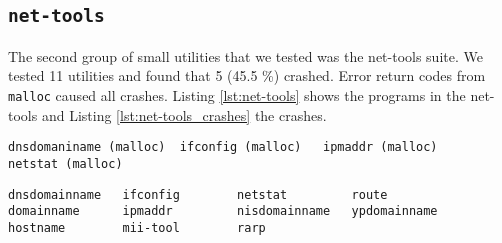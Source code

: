 \subsection{\texttt{net-tools}}
The second group of small utilities that we tested was the net-tools suite. We tested 11 utilities and found that 5 (45.5 \%) crashed. Error return codes from \texttt{malloc} caused all crashes. Listing \ref{lst:net-tools} shows the programs in the net-tools and Listing \ref{lst:net-tools_crashes} the crashes.

\begin{lstlisting}[label={lst:net-tools_crashes},caption={Crashes in net-tools}]
dnsdomaniname (malloc)	ifconfig (malloc)	ipmaddr (malloc)	netstat (malloc)
\end{lstlisting}

\begin{lstlisting}[label={lst:net-tools},caption={Crashes in net-tools}]
dnsdomainname   ifconfig        netstat         route
domainname      ipmaddr         nisdomainname   ypdomainname
hostname        mii-tool        rarp
\end{lstlisting}